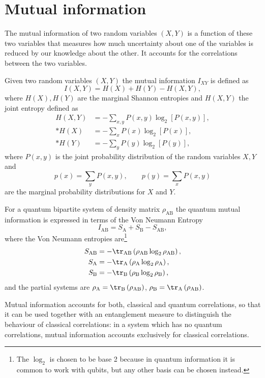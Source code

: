 \section{Mutual information}\label{mutusec}

The mutual information of two random variables $(X,Y)$ is a function of these two variables that measures how much uncertainty about one of the variables is reduced by our knowledge about the other. It accounts for the correlations between the two variables.

Given two random variables $(X,Y)$ the mutual information $I_{XY}$ is defined as
\begin{equation}
I(X,Y)=H(X)+H(Y)-H(X,Y),
\end{equation}
where $H(X),H(Y)$ are the marginal Shannon entropies and $H(X,Y)$ the joint entropy defined as
\begin{align}
H(X,Y)&=-\sum_{x,y}P(x,y)\log_2\left[P(x,y)\right],\\*
H(X)&=-\sum_{x}P(x)\log_2\left[P(x)\right],\\*
H(Y)&=-\sum_{y}P(y)\log_2\left[P(y)\right],
\end{align}
where $P(x,y)$ is the joint probability distribution of the random variables $X,Y$ and
\begin{equation}
p(x)=\sum_yP(x,y),\qquad p(y)=\sum_xP(x,y)
\end{equation}
are the marginal probability distributions for $X$ and $Y$.

For a quantum bipartite system of density matrix $\rho_{\text{AB}}$ the quantum mutual information is expressed in terms of the Von Neumann Entropy
\begin{equation}
I_{\text{AB}}=S_\text{A}+S_\text{B}-S_{\text{AB}},
\end{equation}
where the Von Neumann entropies are\footnote{The $\log_2$ is chosen to be base 2 because in quantum information it is common to work with qubits, but any other basis can be chosen instead.}
\begin{align}
S_{\text{AB}}&=-\tr_{\text{AB}}\left(\rho_{\text{AB}}\log_2\rho_{\text{AB}}\right),\\*
S_{\text{A}}&=-\tr_{\text{A}}\left(\rho_{\text{A}}\log_2\rho_{\text{A}}\right),\\*
S_{\text{B}}&=-\tr_{\text{B}}\left(\rho_{\text{B}}\log_2\rho_{\text{B}}\right),
\end{align}
and the partial systems are $\rho_\text{A}=\tr_\text{B}\left(\rho_\text{AB}\right)$, $\rho_\text{B}=\tr_\text{A}\left(\rho_\text{AB}\right)$.

Mutual information accounts for both, classical and quantum correlations, so that it can be used together with an entanglement measure to distinguish the behaviour of classical correlations: in a system which has no quantum correlations, mutual information accounts exclusively for classical correlations.


